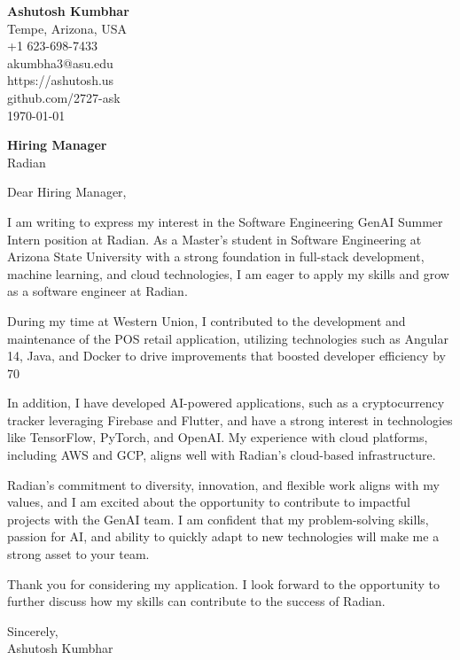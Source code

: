 \documentclass[11pt]{article}
\begin{document}
\begin{flushleft}
\textbf{Ashutosh Kumbhar} \\
Tempe, Arizona, USA \\
+1 623-698-7433 \\
akumbha3@asu.edu \\
https://ashutosh.us \\
github.com/2727-ask \\
\today
\end{flushleft}

\vspace{0.5em}
\textbf{Hiring Manager} \\
Radian

\vspace{1em}

Dear Hiring Manager,

I am writing to express my interest in the Software Engineering GenAI Summer Intern position at Radian. As a Master's student in Software Engineering at Arizona State University with a strong foundation in full-stack development, machine learning, and cloud technologies, I am eager to apply my skills and grow as a software engineer at Radian.

During my time at Western Union, I contributed to the development and maintenance of the POS retail application, utilizing technologies such as Angular 14, Java, and Docker to drive improvements that boosted developer efficiency by 70%

In addition, I have developed AI-powered applications, such as a cryptocurrency tracker leveraging Firebase and Flutter, and have a strong interest in technologies like TensorFlow, PyTorch, and OpenAI. My experience with cloud platforms, including AWS and GCP, aligns well with Radian’s cloud-based infrastructure.

Radian’s commitment to diversity, innovation, and flexible work aligns with my values, and I am excited about the opportunity to contribute to impactful projects with the GenAI team. I am confident that my problem-solving skills, passion for AI, and ability to quickly adapt to new technologies will make me a strong asset to your team.

Thank you for considering my application. I look forward to the opportunity to further discuss how my skills can contribute to the success of Radian.

Sincerely, \\
Ashutosh Kumbhar
\end{document}
